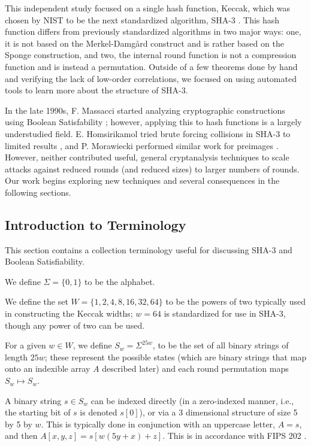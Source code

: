 \documentclass[10pt,twocolumn,twoside]{pnas-new}
\begin{document}
    This independent study focused on a single hash function, Keccak, which
was chosen by NIST to be the next standardized algorithm, SHA-3 \cite{NIST202}.
This hash function differs from previously standardized algorithms in two major
ways: one, it is not based on the Merkel-Damg{\aa}rd construct and is rather
based on the Sponge construction, and two, the internal round function is not a
compression function and is instead a permutation. Outside of a few theorems
done by hand and verifying the lack of low-order correlations, we focused on
using automated tools to learn more about the structure of SHA-3.

    In the late 1990s, F. Massacci started analyzing cryptographic
constructions using Boolean Satisfability \cite{CryptoSAT}; however, applying
this to hash functions is a largely understudied field. E. Homsirikamol tried
brute forcing collisions in SHA-3 to limited results \cite{Homsirikamol2012},
and P. Morawiecki performed similar work for preimages \cite{cryptoeprint:2010:285}.
However, neither contributed useful, general cryptanalysis techniques to scale
attacks against reduced rounds (and reduced sizes) to larger numbers of rounds.
Our work begins exploring new techniques and several consequences in the
following sections.



\subsection{Introduction to Terminology} \label{sec:i:terminology}

This section contains a collection terminology useful for discussing SHA-3
and Boolean Satisfiability.

We define $\Sigma = \{0, 1\}$ to be the alphabet.

We define the set $W = \{1, 2, 4, 8, 16, 32, 64\}$ to be the powers of two
typically used in constructing the Keccak widths; $w=64$ is standardized for
use in SHA-3, though any power of two can be used.

For a given $w \in W$, we define $S_{w} = \Sigma^{25w}$, to be the set of
all binary strings of length $25w$; these represent the possible states (which
are binary strings that map onto an indexible array $A$ described later) and each
round permutation maps $S_{w} \mapsto S_{w}$.

A binary string $s \in S_{w}$ can be indexed directly (in a zero-indexed
manner, i.e., the starting bit of $s$ is denoted $s[0]$), or via a 3
dimensional structure of size 5 by 5 by $w$. This is typically done in
conjunction with an uppercase letter, $A = s$, and then
$A[x, y, z] = s[w(5y + x) + z]$. This is in accordance with
FIPS 202 \cite{NIST202}.
\end{document}
